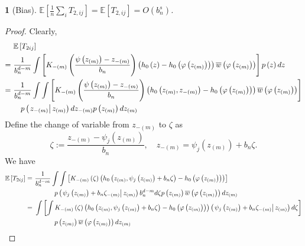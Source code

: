 \documentclass[12pt,american]{article}
\theoremstyle{definition}
\theoremstyle{plain}
\theoremstyle{definition}
\theoremstyle{plain}
\newtheorem{lem}{\protect\lemmaname}
\theoremstyle{plain}
\theoremstyle{plain}
\theoremstyle{plain}
\theoremstyle{plain}
\newcommand{\E}{\mathbb{E}}
\providecommand{\lemmaname}{Lemma}
\providecommand{\lemmaname}{Lemma}
\begin{document}
\begin{lem}[Bias]\label{k-bias}
$\E\left[\frac{1}{n}\sum_{i}T_{2,ij}\right] =  \E\left[T_{2,ij}\right]=O\left(b_{n}^{s}\right)$.
\end{lem}
\begin{proof}
Clearly,
\begin{align*}
&\E\left[T_{2ij}\right] \\
=\ & \frac{1}{b_{n}^{d-m}}\int\left[K_{-\left(m\right)}\left(\frac{\psi\left(z_{\left(m\right)}\right)-z_{-\left(m\right)}}{b_{n}}\right)\left(h_{0}\left(z\right)-h_{0}\left(\varphi\left(z_{\left(m\right)}\right)\right)\right)\ol w\left(\varphi\left(z_{\left(m\right)}\right)\right)\right]p\left(z\right)dz\\
=\  & \frac{1}{b_{n}^{d-m}}\int\int\left[K_{-\left(m\right)}\left(\frac{\psi\left(z_{\left(m\right)}\right)-z_{-\left(m\right)}}{b_{n}}\right)\left(h_{0}\left(z_{\left(m\right)},z_{-\left(m\right)}\right)-h_{0}\left(\varphi\left(z_{\left(m\right)}\right)\right)\right)\ol w\left(\varphi\left(z_{\left(m\right)}\right)\right)\right]\\
&\quad p\left(\rest{z_{-\left(m\right)}}z_{\left(m\right)}\right)dz_{-\left(m\right)} p\left(z_{\left(m\right)}\right)dz_{\left(m\right)}
\end{align*}
Define the change of variable from $z_{-\left(m\right)}$ to $\zeta$
as
\[
\zeta:=\frac{z_{-\left(m\right)}-\psi_{j}\left(z_{\left(m\right)}\right)}{b_{n}},\quad z_{-\left(m\right)}=\psi_{j}\left(z_{\left(m\right)}\right)+b_{n}\zeta.
\]
We have
\begin{align*}
\E\left[T_{2ij}\right]=\  & \frac{1}{b_{n}^{d-m}}\int\int\left[K_{-\left(m\right)}\left(\zeta\right)\left(h_{0}\left(z_{\left(m\right)},\psi_{j}\left(z_{\left(m\right)}\right)+b_{n}\zeta\right)-h_{0}\left(\varphi\left(z_{\left(m\right)}\right)\right)\right)\right]\\
 & \quad\quad\quad p\left(\rest{\psi_{j}\left(z_{\left(m\right)}\right)+b_{n}\zeta_{-\left(m\right)}}z_{\left(m\right)}\right)b_{n}^{d-m}d\zeta p\left(z_{\left(m\right)}\right)\ol w\left(\varphi\left(z_{\left(m\right)}\right)\right)dz_{\left(m\right)}\\
=\  & \int\left[\int K_{-\left(m\right)}\left(\zeta\right)\left(h_{0}\left(z_{\left(m\right)},\psi_{j}\left(z_{\left(m\right)}\right)+b_{n}\zeta\right)-h_{0}\left(\varphi\left(z_{\left(m\right)}\right)\right)\right)\left(\rest{\psi_{j}\left(z_{\left(m\right)}\right)+b_{n}\zeta_{-\left(m\right)}}z_{\left(m\right)}\right)d\zeta\right]\\
 & \quad\quad\quad p\left(z_{\left(m\right)}\right)\ol w\left(\varphi\left(z_{\left(m\right)}\right)\right)dz_{\left(m\right)}\\

\end{align*}
\end{proof}
\end{document}
